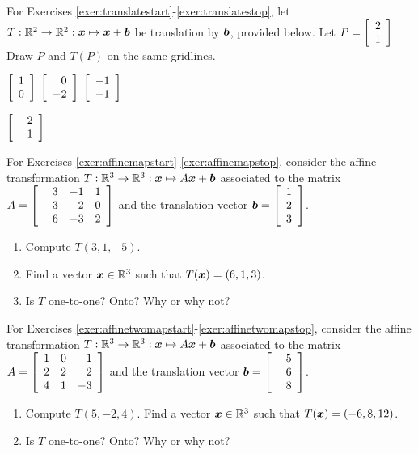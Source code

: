 \noindent For Exercises \ref{exer:translatestart}-\ref{exer:translatestop}, let $T : \R^2\to \R^2 : \bb x \mapsto \bb x+ \bb b$ be translation by $\bb b$, provided below. Let $P=\vr{2\\1}$.  Draw $P$ and $T(P)$ on the same gridlines.
\begin{enumerate}[!HW!, label=$\spadesuit$ \arabic*., ref=\arabic*]
\begin{multicols}{4}
\item\label{exer:translatestart} $\vr{1 \\ 0}$
\itemspade $\vr{0 \\-2}$
\itemspade $\vr{ -1\\-1}$
\item\label{exer:translatestop} $\vr{ -2\\1}$
\end{multicols}
\end{enumerate}

\noindent For Exercises \ref{exer:affinemapstart}-\ref{exer:affinemapstop}, consider the affine transformation $T : \R^3\to \R^3 : \bb x \mapsto A\bb x + \bb b$ associated to the matrix\\ $A = \mtx{rrr}{3&-1&1\\-3&2&0\\6&-3&2}$ and the translation vector $\bb b = \vr{1\\2\\3}$. 
\begin{enumerate}[!HW!]
\item\label{exer:affinemapstart} Compute $T(3,1,-5)$.
\item Find a vector $\bb x\in \R^3$ such that $T(\bb x) = (6,1,3)$. 
\item\label{exer:affinemapstop} Is $T$ one-to-one? Onto? Why or why not?
\end{enumerate}

\noindent For Exercises \ref{exer:affinetwomapstart}-\ref{exer:affinetwomapstop}, consider the affine transformation $T : \R^3\to \R^3 : \bb x \mapsto A\bb x + \bb b$ associated to the matrix\\ $A = \mtx{rrr}{1&0&-1\\2&2&2\\4&1&-3}$ and the translation vector $\bb b = \vr{-5\\6\\8}$. %
\begin{enumerate}[!HW!, label=$\spadesuit$ \arabic*., ref=\arabic*]
\item\label{exer:affinetwomapstart} Compute $T(5,-2,4)$.
\itemspade Find a vector $\bb x\in \R^3$ such that $T(\bb x) = (-6,8,12)$. 
\item\label{exer:affinetwomapstop} Is $T$ one-to-one? Onto? Why or why not?
\end{enumerate}

